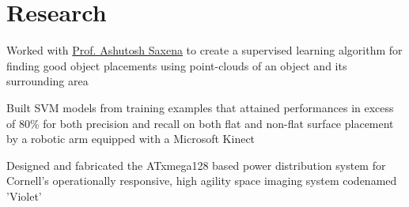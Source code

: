 \documentclass[]{resume-openfont}
\begin{document}
\section{Research}
            \begin{tightemize}
                \item
                    Worked with \href{http://www.cs.cornell.edu/~asaxena/}{
                    Prof. Ashutosh Saxena} to create a supervised learning
                    algorithm for finding good object placements using
                    point-clouds of an object and its surrounding area
                \item
                    Built SVM models from training examples that attained
                    performances in excess of 80\% for both precision and
                    recall on both flat and non-flat surface placement by
                    a robotic arm
                    equipped with a Microsoft Kinect
            \end{tightemize}
    \sectionsep

            \begin{tightemize}
                \item
                    Designed and fabricated the ATxmega128 based power
                    distribution system for Cornell’s operationally responsive,
                    high agility space imaging system codenamed 'Violet'
            \end{tightemize}
    \sectionsep
\end{document}
